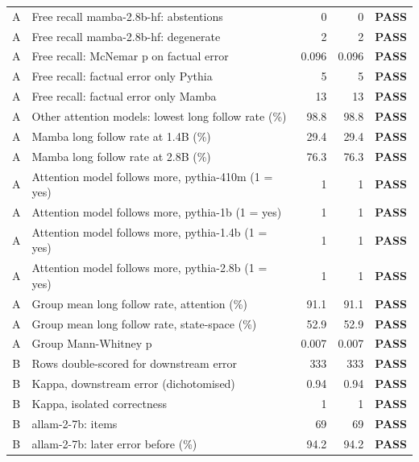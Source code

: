 {\begin{longtable}{@{}cp{8.2cm}rrc@{}}
A & Free recall mamba-2.8b-hf: abstentions & 0 & 0 & \textcolor{okgreen}{\textbf{PASS}} \\
A & Free recall mamba-2.8b-hf: degenerate & 2 & 2 & \textcolor{okgreen}{\textbf{PASS}} \\
A & Free recall: McNemar p on factual error & 0.096 & 0.096 & \textcolor{okgreen}{\textbf{PASS}} \\
A & Free recall: factual error only Pythia & 5 & 5 & \textcolor{okgreen}{\textbf{PASS}} \\
A & Free recall: factual error only Mamba & 13 & 13 & \textcolor{okgreen}{\textbf{PASS}} \\
A & Other attention models: lowest long follow rate (\%) & 98.8 & 98.8 & \textcolor{okgreen}{\textbf{PASS}} \\
A & Mamba long follow rate at 1.4B (\%) & 29.4 & 29.4 & \textcolor{okgreen}{\textbf{PASS}} \\
A & Mamba long follow rate at 2.8B (\%) & 76.3 & 76.3 & \textcolor{okgreen}{\textbf{PASS}} \\
A & Attention model follows more, pythia-410m (1 = yes) & 1 & 1 & \textcolor{okgreen}{\textbf{PASS}} \\
A & Attention model follows more, pythia-1b (1 = yes) & 1 & 1 & \textcolor{okgreen}{\textbf{PASS}} \\
A & Attention model follows more, pythia-1.4b (1 = yes) & 1 & 1 & \textcolor{okgreen}{\textbf{PASS}} \\
A & Attention model follows more, pythia-2.8b (1 = yes) & 1 & 1 & \textcolor{okgreen}{\textbf{PASS}} \\
A & Group mean long follow rate, attention (\%) & 91.1 & 91.1 & \textcolor{okgreen}{\textbf{PASS}} \\
A & Group mean long follow rate, state-space (\%) & 52.9 & 52.9 & \textcolor{okgreen}{\textbf{PASS}} \\
A & Group Mann-Whitney p & 0.007 & 0.007 & \textcolor{okgreen}{\textbf{PASS}} \\
B & Rows double-scored for downstream error & 333 & 333 & \textcolor{okgreen}{\textbf{PASS}} \\
B & Kappa, downstream error (dichotomised) & 0.94 & 0.94 & \textcolor{okgreen}{\textbf{PASS}} \\
B & Kappa, isolated correctness & 1 & 1 & \textcolor{okgreen}{\textbf{PASS}} \\
B & allam-2-7b: items & 69 & 69 & \textcolor{okgreen}{\textbf{PASS}} \\
B & allam-2-7b: later error before (\%) & 94.2 & 94.2 & \textcolor{okgreen}{\textbf{PASS}} \\

\end{longtable}}
